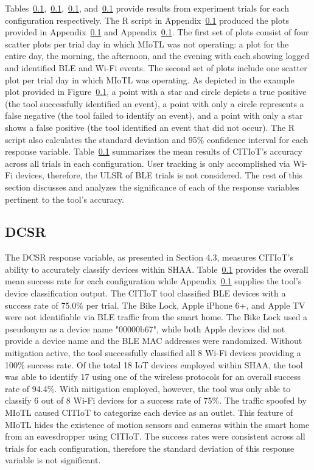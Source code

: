 \documentclass[12pt,letterpaper,oneside]{book}
\begin{document}
	Tables~\ref{},~\ref{},~\ref{}, and~\ref{} provide results from experiment trials for each configuration respectively. The R script in Appendix~\ref{} produced the plots provided in Appendix~\ref{} and Appendix~\ref{}. The first set of plots consist of four scatter plots per trial day in which \ac{MIoTL} was not operating: a plot for the entire day, the morning, the afternoon, and the evening with each showing logged and identified \ac{BLE} and Wi-Fi events. The second set of plots include one scatter plot per trial day in which \ac{MIoTL} was operating. As depicted in the example plot provided in Figure~\ref{}, a point with a star and circle depicts a true positive (the tool successfully identified an event), a point with only a circle represents a false negative (the tool failed to identify an event), and a point with only a star shows a false positive (the tool identified an event that did not occur). The R script also calculates the standard deviation and 95\% confidence interval for each response variable. Table~\ref{} summarizes the mean results of \ac{CITIoT}'s accuracy across all trials in each configuration. User tracking is only accomplished via Wi-Fi devices, therefore, the \ac{ULSR} of \ac{BLE} trials is not considered. The rest of this section discusses and analyzes the significance of each of the response variables pertinent to the tool's accuracy.
	
	
	\subsection{\ac{DCSR}}
	The \ac{DCSR} response variable, as presented in Section 4.3, measures \ac{CITIoT}'s ability to accurately classify devices within \ac{SHAA}. Table~\ref{} provides the overall mean success rate for each configuration while Appendix~\ref{} supplies the tool's device classification output. The \ac{CITIoT} tool classified \ac{BLE} devices with a success rate of 75.0\% per trial. The Bike Lock, Apple iPhone 6+, and Apple TV were not identifiable via \ac{BLE} traffic from the smart home. The Bike Lock used a pseudonym as a device name "00000b67", while both Apple devices did not provide a device name and the \ac{BLE} \ac{MAC} addresses were randomized. Without mitigation active, the tool successfully classified all 8 Wi-Fi devices providing a 100\% success rate. Of the total 18 \ac{IoT} devices employed within \ac{SHAA}, the tool was able to identify 17 using one of the wireless protocols for an overall success rate of 94.4\%. With mitigation employed, however, the tool was only able to classify 6 out of 8 Wi-Fi devices for a success rate of 75\%. The traffic spoofed by \ac{MIoTL} caused \ac{CITIoT} to categorize each device as an outlet. This feature of \ac{MIoTL} hides the existence of motion sensors and cameras within the smart home from an eavesdropper using \ac{CITIoT}.  The success rates were consistent across all trials for each configuration, therefore the standard deviation of this response variable is not significant.
	
\end{document}
